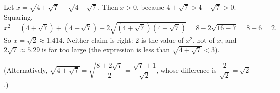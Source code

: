 Let $x=\sqrt{4+\sqrt7}-\sqrt{4-\sqrt7}$. Then $x>0$, because $4+\sqrt7>4-\sqrt7>0$. Squaring,
\[
x^2=(4+\sqrt7)+(4-\sqrt7)-2\sqrt{(4+\sqrt7)(4-\sqrt7)}=8-2\sqrt{16-7}=8-6=2 .
\]
So $x=\boxed{\sqrt2}\approx1.414$. Neither claim is right: $2$ is the value of $x^2$, not of $x$, and $2\sqrt7\approx5.29$ is far too large (the expression is less than $\sqrt{4+\sqrt7}<3$).

(Alternatively, $\sqrt{4\pm\sqrt7}=\sqrt{\dfrac{8\pm2\sqrt7}{2}}=\dfrac{\sqrt7\pm1}{\sqrt2}$, whose difference is $\dfrac{2}{\sqrt2}=\sqrt2$.)
